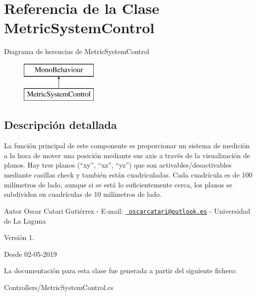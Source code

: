 \hypertarget{class_metric_system_control}{}\section{Referencia de la Clase Metric\+System\+Control}
\label{class_metric_system_control}
Diagrama de herencias de Metric\+System\+Control\begin{figure}[H]
\begin{center}
\leavevmode
\includegraphics[height=2.000000cm]{class_metric_system_control}
\end{center}
\end{figure}


\subsection{Descripción detallada}
La función principal de este componente es proporcionar un sistema de medición a la hora de mover una posición mediante sus axis a través de la visualización de planos. Hay tres planos (“xy”, “xz”, “yz”) que son activables/desactivables mediante casillas check y también están cuadriculadas. Cada cuadrícula es de 100 milímetros de lado, aunque si se está lo suficientemente cerca, los planos se subdividen en cuadrículas de 10 milímetros de lado. \begin{DoxyAuthor}{Autor}
Oscar Catari Gutiérrez -\/ E-\/mail\+: \href{mailto:oscarcatari@outlook.es}{\texttt{ oscarcatari@outlook.\+es}} -\/ Universidad de La Laguna 
\end{DoxyAuthor}
\begin{DoxyVersion}{Versión}
1. 
\end{DoxyVersion}
\begin{DoxySince}{Desde}
02-\/05-\/2019 
\end{DoxySince}


La documentación para esta clase fue generada a partir del siguiente fichero\+:\begin{DoxyCompactItemize}
\item 
Controllers/Metric\+System\+Control.\+cs\end{DoxyCompactItemize}
